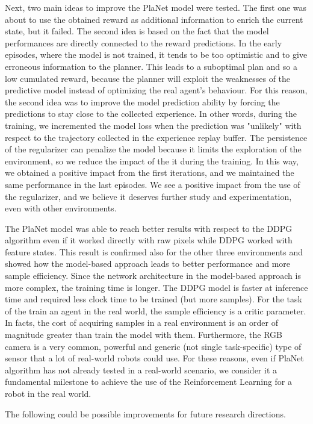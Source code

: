 Next, two main ideas to improve the PlaNet model were tested. The first one was about to use the obtained reward as additional information to enrich the current state, but it failed.
The second idea is based on the fact that the model performances are directly connected to the reward predictions. In the early episodes, where the model is not trained, it tends to be too optimistic and to give erroneous information to the planner. This leads to a suboptimal plan and so a low cumulated reward, because the planner will exploit the weaknesses of the predictive model instead of optimizing the real agent's behaviour. For this reason, the second idea was to improve the model prediction ability by forcing the predictions to stay close to the collected experience. In other words, during the training, we incremented the model loss when the prediction was "unlikely" with respect to the trajectory collected in the experience replay buffer. The persistence of the regularizer can penalize the model because it limits the exploration of the environment, so we reduce the impact of the it during the training. In this way, we obtained a positive impact from the first iterations, and we maintained the same performance in the last episodes. We see a positive impact from the use of the regularizer, and we believe it deserves further study and experimentation, even with other environments.

The PlaNet model was able to reach better results with respect to the DDPG algorithm even if it worked directly with raw pixels while DDPG worked with feature states. This result is confirmed also for the other three environments and showed how the model-based approach leads to better performance and more sample efficiency. Since the network architecture in the model-based approach is more complex, the training time is longer. The DDPG model is faster at inference time and required less clock time to be trained (but more samples). For the task of the train an agent in the real world, the sample efficiency is a critic parameter. In facts, the cost of acquiring samples in a real environment is an order of magnitude greater than train the model with them.
Furthermore, the RGB camera is a very common, powerful and generic (not single task-specific) type of sensor that a lot of real-world robots could use. For these reasons, even if PlaNet algorithm has not already tested in a real-world scenario, we consider it a fundamental milestone to achieve the use of the Reinforcement Learning for a robot in the real world.

The following could be possible improvements for future research directions.\\

